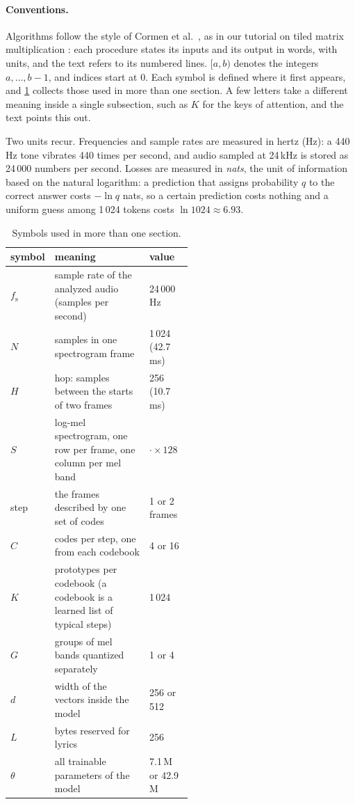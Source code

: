 \paragraph{Conventions.} Algorithms follow the style of Cormen et al.\
\cite{cormen2022introduction}, as in our tutorial on tiled matrix
multiplication \cite{pathak2026tiled}: each procedure states its inputs and its
output in words, with units, and the text refers to its numbered lines.
$[a, b)$ denotes the integers $a, \dots, b-1$, and indices start at 0. Each
symbol is defined where it first appears, and \cref{tab:symbols} collects those
used in more than one section. A few letters take a different meaning inside a
single subsection, such as $K$ for the keys of attention, and the text points
this out.

Two units recur. Frequencies and sample rates are measured in hertz (Hz): a
440\,Hz tone vibrates 440 times per second, and audio sampled at 24\,kHz is
stored as 24\,000 numbers per second. Losses are measured in \emph{nats}, the
unit of information based on the natural logarithm: a prediction that assigns
probability $q$ to the correct answer costs $-\ln q$ nats, so a certain
prediction costs nothing and a uniform guess among 1\,024 tokens costs
$\ln 1024 \approx 6.93$.

\begin{table}[htbp]
\centering
\caption{Symbols used in more than one section.}
\label{tab:symbols}
\footnotesize
\begin{tabular}{@{}lp{0.52\linewidth}l@{}}
\toprule
symbol & meaning & value \\
\midrule
$f_\text{s}$ & sample rate of the analyzed audio (samples per second) & 24\,000\,Hz \\
$N$ & samples in one spectrogram frame & 1\,024 (42.7\,ms) \\
$H$ & hop: samples between the starts of two frames & 256 (10.7\,ms) \\
$S$ & log-mel spectrogram, one row per frame, one column per mel band & $\cdot \times 128$ \\
step & the frames described by one set of codes & 1 or 2 frames \\
$C$ & codes per step, one from each codebook & 4 or 16 \\
$K$ & prototypes per codebook (a codebook is a learned list of typical steps) & 1\,024 \\
$G$ & groups of mel bands quantized separately & 1 or 4 \\
$d$ & width of the vectors inside the model & 256 or 512 \\
$L$ & bytes reserved for lyrics & 256 \\
$\theta$ & all trainable parameters of the model & 7.1\,M or 42.9\,M \\
\bottomrule
\end{tabular}
\end{table}

